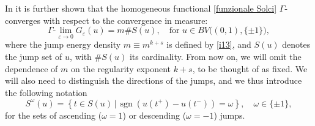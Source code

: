 \documentclass{article}
\theoremstyle{definition}
\newcommand{\e}{\varepsilon}
\def\e{\varepsilon}
\newcommand{\sgn}{\operatorname{sgn}}
\begin{document}
In \cite{Solci_2024} it is further shown that the homogeneous functional \eqref{funzionale Solci} $\Gamma$-converges with respect to the convergence in measure:
\[
\Gamma\text{-}\lim_{\e\to 0} G_\e(u) = m\#S(u),\quad \text{for } u \in BV\big((0,1),\{\pm 1\}\big),
\]
where the jump energy density $m\equiv m^{k+s}$ is defined by \eqref{i13}, and $S(u)$ denotes the jump set of $u$, with $\# S(u)$ its cardinality. From now on, we will omit the dependence of $m$ on the regularity exponent $k+s$, to be thought of as fixed. We will also need to distinguish the directions of the jumps, and we thus introduce the following notation
\begin{equation}
\label{def: S^pm}
    S^\omega(u) = \left\{t\in S(u)\,|\, \sgn\left(u(t^+)-u(t^-)\right) = \omega\right\}, \quad \omega\in\{\pm 1\},
\end{equation}
for the sets of ascending ($\omega=1$) or descending ($\omega=-1$) jumps.
\end{document}
